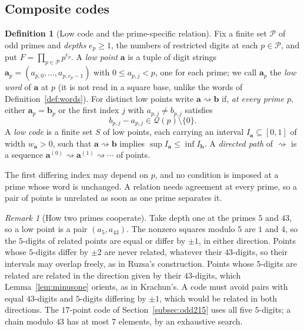 \documentclass[11pt]{article}
\theoremstyle{definition}
\newtheorem{definition}[theorem]{Definition}
\theoremstyle{remark}
\newtheorem{remark}[theorem]{Remark}
\newcommand{\QR}{\mathcal Q}
\newcommand{\sto}{\rightsquigarrow}
\begin{document}
\subsection{Composite codes}\label{subsec:composite}
\begin{definition}[Low code and the prime-specific relation]\label{def:lowcode}
Fix a finite set $\mathcal P$ of odd primes and \emph{depths} $e_{p}\ge1$, the
numbers of restricted digits at each $p\in\mathcal P$, and put
$F=\prod_{p\in\mathcal P}p^{e_p}$. A \emph{low point} $\mathbf a$ is a tuple of
digit strings $\mathbf a_p=(a_{p,0},\ldots,a_{p,e_p-1})$ with $0\le a_{p,j}<p$,
one for each prime; we call $\mathbf a_p$ the \emph{low word} of $\mathbf a$
at $p$ (it is not read in a square base, unlike the words of
Definition~\ref{def:words}). For distinct low points write $\mathbf a\sto\mathbf b$ if, \emph{at
every prime $p$}, either $\mathbf a_p=\mathbf b_p$ or the first index $j$ with
$a_{p,j}\ne b_{p,j}$ satisfies
\begin{equation}\label{eq:lowedge}
 b_{p,j}-a_{p,j}\in\QR(p)\setminus\{0\}.
\end{equation}
A \emph{low code} is a finite set $S$ of low points, each carrying an interval
$I_{\mathbf a}\subseteq[0,1]$ of width $w_{\mathbf a}>0$, such that
$\mathbf a\sto\mathbf b$ implies $\sup I_{\mathbf a}\le\inf I_{\mathbf b}$.
A \emph{directed path} of $\sto$ is a sequence
$\mathbf a^{(0)}\sto\mathbf a^{(1)}\sto\cdots$ of points.
\end{definition}
The first differing index may depend on $p$, and no condition is imposed at a
prime whose word is unchanged. A relation needs agreement at every prime, so a
pair of points is unrelated as soon as one prime separates it.

\begin{remark}[How two primes cooperate]\label{rem:composite}
Take depth one at the primes $5$ and $43$, so a low point is a pair
$(a_5,a_{43})$. The nonzero squares modulo $5$ are $1$ and $4$, so the
$5$-digits of related points are equal or differ by $\pm1$, in either
direction. Points whose $5$-digits differ by $\pm2$ are never related,
whatever their $43$-digits, so their intervals may overlap freely, as in
Ruzsa's construction. Points whose $5$-digits are related are related in the
direction given by their $43$-digits, which Lemma~\ref{lem:minusone} orients,
as in Krachun's. A code must avoid pairs with equal $43$-digits and $5$-digits
differing by $\pm1$, which would be related in both directions. The
$17$-point code of Section~\ref{subsec:odd215} uses all five $5$-digits; a
chain modulo $43$ has at most $7$ elements, by an exhaustive search.
\end{remark}
\end{document}
